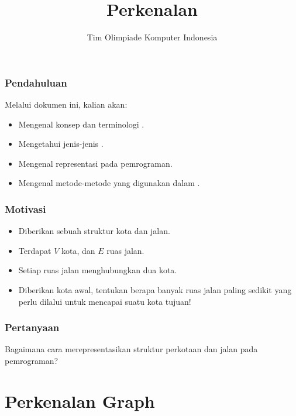 

\title{Perkenalan \fGraph}
\author{Tim Olimpiade Komputer Indonesia}
\date{}

\usepackage{verbatim}
\usepackage{multicol}



\begin{frame}
\titlepage
\end{frame}

\begin{frame}
\frametitle{Pendahuluan}
Melalui dokumen ini, kalian akan:
\begin{itemize}
  \item Mengenal konsep dan terminologi \fgraph.
  \item Mengetahui jenis-jenis \fgraph.
  \item Mengenal representasi \fgraph pada pemrograman.
  \item Mengenal metode-metode yang digunakan dalam \fgraph.
\end{itemize}
\end{frame}

\begin{frame}
\frametitle{Motivasi}
\begin{itemize}
  \item Diberikan sebuah struktur kota dan jalan.
  \item Terdapat $V$ kota, dan $E$ ruas jalan.
  \item Setiap ruas jalan menghubungkan dua kota.
  \item Diberikan kota awal, tentukan berapa banyak ruas jalan paling sedikit yang perlu dilalui untuk mencapai suatu kota tujuan!
\end{itemize}
\end{frame}

\begin{frame}
\frametitle{Pertanyaan}
\begin{center}
  \large Bagaimana cara merepresentasikan struktur perkotaan dan jalan pada pemrograman?
\end{center}
\end{frame}

\section{Perkenalan Graph}
\frame{\sectionpage}

